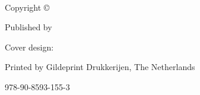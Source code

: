 \maketitle

\clearpage\thispagestyle{empty}
\begin{fullwidth}
	~\vfill

	\setlength{\parindent}{0pt}
	\setlength{\parskip}{\baselineskip}


	Copyright \copyright\ \the\year\ \thanklessauthor

	Published by \thanklesspublisher

	Cover design: \thanklessauthor

	Printed by Gildeprint Drukkerijen, The Netherlands

	 978-90-8593-155-3
\end{fullwidth}

